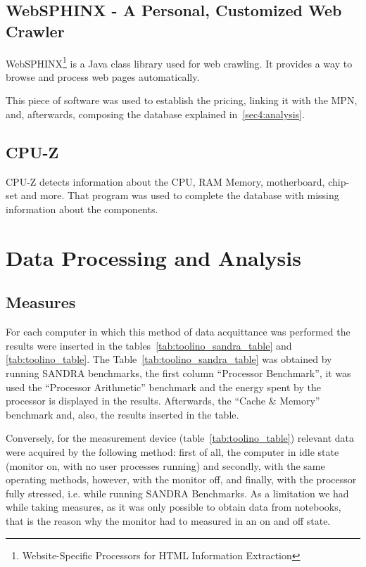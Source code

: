     \subsection{WebSPHINX - A Personal, Customized Web Crawler} \label{sec3:websphinx}
        WebSPHINX\footnote{Website-Specific Processors for HTML Information Extraction} is a Java class library used for web crawling. It provides a way to browse and process web pages automatically.
        
        This piece of software was used to establish the pricing, linking it with the MPN, and, afterwards, composing the database explained in~\ref{sec4:analysis}. 
    
    \subsection{CPU-Z} \label{sec3:cpu-z}
        CPU-Z detects information about the CPU, RAM Memory, motherboard, chip-set and more. That program was used to complete the database with missing information about the components.

\section{Data Processing and Analysis} \label{sec3:data_processing_analysis}
    
    \subsection{Measures}\label{sec3:measures}
        For each computer in which this method of data acquittance was performed the results were inserted in the tables~\ref{tab:toolino_sandra_table} and \ref{tab:toolino_table}. The Table~\ref{tab:toolino_sandra_table} was obtained by running SANDRA benchmarks, the first column ``Processor Benchmark'', it was used the ``Processor Arithmetic'' benchmark and the energy spent by the processor is displayed in the results. Afterwards, the ``Cache \& Memory'' benchmark and, also, the results inserted in the table.
        
        Conversely, for the measurement device (table~\ref{tab:toolino_table}) relevant data were acquired by the following method: first of all, the computer in idle state (monitor on, with no user processes running) and secondly, with the same operating methods, however, with the monitor off, and finally, with the processor fully stressed, i.e. while running SANDRA Benchmarks. As a limitation we had while taking measures, as it was only possible to obtain data from notebooks, that is the reason why the monitor had to measured in an on and off state.
        
